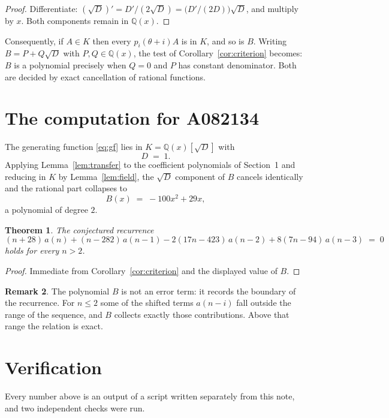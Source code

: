 \documentclass[11pt,a4paper]{article}
\theoremstyle{plain}
\newtheorem{theorem}{Theorem}
\theoremstyle{definition}
\newtheorem{remark}[theorem]{Remark}
\begin{document}
\begin{proof}
Differentiate: $(\sqrt{D})'=D'/(2\sqrt{D})=\bigl(D'/(2D)\bigr)\sqrt{D}$, and multiply by
$x$. Both components remain in $\mathbb{Q}(x)$.
\end{proof}

Consequently, if $A\in K$ then every $p_{i}(\theta+i)A$ is in $K$, and so is $B$. Writing
$B=P+Q\sqrt{D}$ with $P,Q\in\mathbb{Q}(x)$, the test of Corollary~\ref{cor:criterion}
becomes: $B$ is a polynomial precisely when $Q=0$ and $P$ has constant denominator. Both
are decided by exact cancellation of rational functions.

\section{The computation for A082134}

The generating function \eqref{eq:gf} lies in $K=\mathbb{Q}(x)[\sqrt{D}]$ with
\[
D \;=\; 1 .
\]
Applying Lemma~\ref{lem:transfer} to the coefficient polynomials of Section~1 and reducing
in $K$ by Lemma~\ref{lem:field}, the $\sqrt{D}$ component of $B$ cancels identically and
the rational part collapses to
\[
B(x)\;=\;- 100 x^{2} + 29 x ,
\]
a polynomial of degree $2$.

\begin{theorem}
The conjectured recurrence
\[
(n + 28)\,a(n) + (n - 282)\,a(n-1) -  2 \left(17 n - 423\right)\,a(n-2) + 8 \left(7 n - 94\right)\,a(n-3) \;=\;0
\]
holds for every $n>2$.
\end{theorem}

\begin{proof}
Immediate from Corollary~\ref{cor:criterion} and the displayed value of $B$.
\end{proof}

\begin{remark}
The polynomial $B$ is not an error term: it records the boundary of the recurrence. For
$n\le2$ some of the shifted terms $a(n-i)$ fall outside the range of the sequence,
and $B$ collects exactly those contributions. Above that range the relation is exact.
\end{remark}

\section{Verification}

Every number above is an output of a script written separately from this note, and two
independent checks were run.
\end{document}

